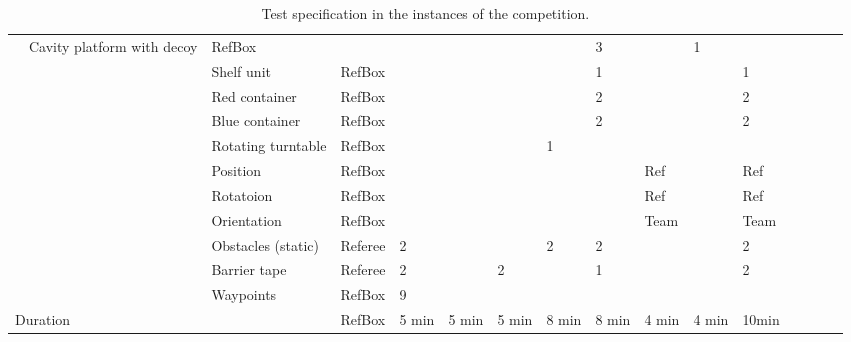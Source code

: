 \begin{landscape}
\begin{table}[h!]
\begin{tabular}{|l|l|l|l*{12}{|P{1cm}}|}
         & Cavity platform with decoy& RefBox   &       &       &       &       &       &  3   &   & 1   \\ \hhline{~~----------}
      &  & Shelf unit          & RefBox &       &       &       &       &   1     &        &   & 1   \\ \hhline{~~----------}
      &  & Red container       & RefBox &       &       &       &       &  2   &       &   &  2   \\ \hhline{~~----------}
      &  & Blue container      & RefBox &       &       &       &       &  2   &       &   &  2   \\ \hhline{~~----------}
      &  & Rotating turntable  & RefBox &       &       &       &   1   &      &       &   &    \\
      \hhline{------------} \hhline{------------}
      & 
         & Position     & RefBox &       &       &       &      &      &   Ref	  &   &  Ref   \\ \hhline{~~----------}
      &  & Rotatoion	& RefBox &       &       &       &      &      &   Ref    &   &  Ref   \\ \hhline{~~----------}
      &  & Orientation	& RefBox &       &       &       &      &      &   Team   &   &  Team  \\
    \hhline{~-----------} \hhline{~-----------}
     & 
     &     Obstacles (static) & Referee &   2   &       &       &   2   &   2   &       &   & 2   \\ \hhline{~~----------}
     &   & Barrier tape       & Referee &   2   &       &    2   &       &   1   &       &   & 2   \\ \hhline{~~----------}
     &   & Waypoints          & RefBox  &   9   &       &       &       &       &       &   &    \\
		\hline \hline
		 \multicolumn{3}{|l|}{Duration}
		                    & RefBox & 5 min & 5 min & 5 min  &   8 min &   8 min &  4 min &  4 min & 10min \\
		\hline
 \end{tabular}
 \caption{Test specification in the instances of the \RCAW \YEAR competition.}
 \label{tab:Instances}
\end{table}
\end{landscape}

